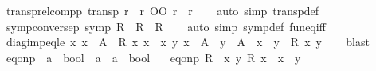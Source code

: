 \begin{isabellebody}
\endisatagproof
{\isafoldproof}%
%
\isadelimproof
\isanewline
%
\endisadelimproof
\isanewline
{}\isamarkupfalse%
\ transp{\isacharunderscore}{\kern0pt}relcompp{\isacharcolon}{\kern0pt}\ {\isachardoublequoteopen}transp\ r\ {\isasymlongleftrightarrow}\ r\ OO\ r\ {\isasymle}\ r{\isachardoublequoteclose}\isanewline
%
\isadelimproof
\ \ %
\endisadelimproof
%
\isatagproof
{}\isamarkupfalse%
\ {\isacharparenleft}{\kern0pt}auto\ simp{\isacharcolon}{\kern0pt}\ transp{\isacharunderscore}{\kern0pt}def{\isacharparenright}{\kern0pt}%
\endisatagproof
{\isafoldproof}%
%
\isadelimproof
\isanewline
%
\endisadelimproof
\isanewline
{}\isamarkupfalse%
\ symp{\isacharunderscore}{\kern0pt}conversep{\isacharcolon}{\kern0pt}\ {\isachardoublequoteopen}symp\ R\ {\isacharequal}{\kern0pt}\ {\isacharparenleft}{\kern0pt}R{\isasyminverse}{\isasyminverse}\ {\isasymle}\ R{\isacharparenright}{\kern0pt}{\isachardoublequoteclose}\isanewline
%
\isadelimproof
\ \ %
\endisadelimproof
%
\isatagproof
{}\isamarkupfalse%
\ {\isacharparenleft}{\kern0pt}auto\ simp{\isacharcolon}{\kern0pt}\ symp{\isacharunderscore}{\kern0pt}def\ fun{\isacharunderscore}{\kern0pt}eq{\isacharunderscore}{\kern0pt}iff{\isacharparenright}{\kern0pt}%
\endisatagproof
{\isafoldproof}%
%
\isadelimproof
\isanewline
%
\endisadelimproof
\isanewline
{}\isamarkupfalse%
\ diag{\isacharunderscore}{\kern0pt}imp{\isacharunderscore}{\kern0pt}eq{\isacharunderscore}{\kern0pt}le{\isacharcolon}{\kern0pt}\ {\isachardoublequoteopen}{\isacharparenleft}{\kern0pt}{\isasymAnd}x{\isachardot}{\kern0pt}\ x\ {\isasymin}\ A\ {\isasymLongrightarrow}\ R\ x\ x{\isacharparenright}{\kern0pt}\ {\isasymLongrightarrow}\ {\isasymforall}x\ y{\isachardot}{\kern0pt}\ x\ {\isasymin}\ A\ {\isasymlongrightarrow}\ y\ {\isasymin}\ A\ {\isasymlongrightarrow}\ x\ {\isacharequal}{\kern0pt}\ y\ {\isasymlongrightarrow}\ R\ x\ y{\isachardoublequoteclose}\isanewline
%
\isadelimproof
\ \ %
\endisadelimproof
%
\isatagproof
{}\isamarkupfalse%
\ blast%
\endisatagproof
{\isafoldproof}%
%
\isadelimproof
\isanewline
%
\endisadelimproof
\isanewline
{}\isamarkupfalse%
\ eq{\isacharunderscore}{\kern0pt}onp\ {\isacharcolon}{\kern0pt}{\isacharcolon}{\kern0pt}\ {\isachardoublequoteopen}{\isacharparenleft}{\kern0pt}{\isacharprime}{\kern0pt}a\ {\isasymRightarrow}\ bool{\isacharparenright}{\kern0pt}\ {\isasymRightarrow}\ {\isacharprime}{\kern0pt}a\ {\isasymRightarrow}\ {\isacharprime}{\kern0pt}a\ {\isasymRightarrow}\ bool{\isachardoublequoteclose}\isanewline
\ \ \ {\isachardoublequoteopen}eq{\isacharunderscore}{\kern0pt}onp\ R\ {\isacharequal}{\kern0pt}\ {\isacharparenleft}{\kern0pt}{\isasymlambda}x\ y{\isachardot}{\kern0pt}\ R\ x\ {\isasymand}\ x\ {\isacharequal}{\kern0pt}\ y{\isacharparenright}{\kern0pt}{\isachardoublequoteclose}\isanewline

\end{isabellebody}
